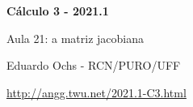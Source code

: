 \documentclass[oneside,12pt]{article}
\begin{document}


%
%

\def\C{\mathbb{C}}

\def\drafturl{http://angg.twu.net/LATEX/2021-1-C3.pdf}
\def\drafturl{http://angg.twu.net/2021.1-C3.html}
\def\draftfooter{\tiny \href{\drafturl}{\jobname{}} \ColorBrown{\shorttoday{} \hours}}



%

\thispagestyle{empty}

\begin{center}

\vspace*{1.2cm}

{\bf \Large Cálculo 3 - 2021.1}

\bsk

Aula 21: a matriz jacobiana

\bsk

Eduardo Ochs - RCN/PURO/UFF

\url{http://angg.twu.net/2021.1-C3.html}

\end{center}
\end{document}
